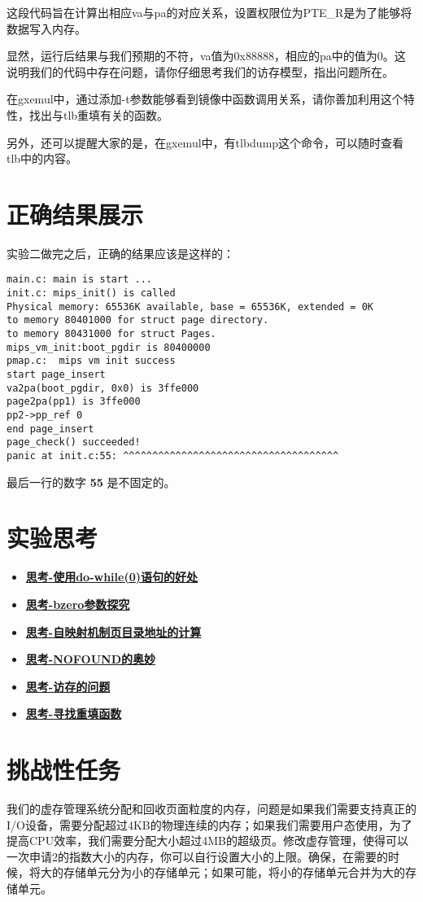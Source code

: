   这段代码旨在计算出相应va与pa的对应关系，设置权限位为PTE\_R是为了能够将数据写入内存。
  \begin{thinking}\label{think-memory-access}
  显然，运行后结果与我们预期的不符，va值为0x88888，相应的pa中的值为0。这说明我们的代码中存在问题，请你仔细思考我们的访存模型，指出问题所在。
  \end{thinking}
  \begin{thinking}\label{think-tlb-refill}
  在gxemul中，通过添加-t参数能够看到镜像中函数调用关系，请你善加利用这个特性，找出与tlb重填有关的函数。
  \end{thinking}
  另外，还可以提醒大家的是，在gxemul中，有tlbdump这个命令，可以随时查看tlb中的内容。
\section{正确结果展示}

实验二做完之后，正确的结果应该是这样的：

\begin{verbatim}
main.c: main is start ...
init.c: mips_init() is called
Physical memory: 65536K available, base = 65536K, extended = 0K
to memory 80401000 for struct page directory.
to memory 80431000 for struct Pages.
mips_vm_init:boot_pgdir is 80400000
pmap.c:  mips vm init success
start page_insert
va2pa(boot_pgdir, 0x0) is 3ffe000
page2pa(pp1) is 3ffe000
pp2->pp_ref 0
end page_insert
page_check() succeeded!
panic at init.c:55: ^^^^^^^^^^^^^^^^^^^^^^^^^^^^^^^^^^^^^
\end{verbatim}

最后一行的数字 \textbf{55} 是不固定的。

\section{实验思考}

\begin{itemize}
\item \hyperref[think-do_while]{\textbf{\textcolor{baseB}{思考-使用do-while(0)语句的好处}}}
\item \hyperref[think-bzero]{\textbf{\textcolor{baseB}{思考-bzero参数探究}}}
\item \hyperref[think-windows_pde_addr]{\textbf{\textcolor{baseB}{思考-自映射机制页目录地址的计算}}}
\item \hyperref[think-tlb]{\textbf{\textcolor{baseB}{思考-NOFOUND的奥妙}}}
\item \hyperref[think-memory-access]{\textbf{\textcolor{baseB}{思考-访存的问题}}}
\item \hyperref[think-tlb-refill]{\textbf{\textcolor{baseB}{思考-寻找重填函数}}}
\end{itemize}

\section{挑战性任务}

我们的虚存管理系统分配和回收页面粒度的内存，问题是如果我们需要支持真正的I/O设备，需要分配超过4KB的物理连续的内存；如果我们需要用户态使用，为了提高CPU效率，我们需要分配大小超过4MB的超级页。修改虚存管理，使得可以一次申请2的指数大小的内存，你可以自行设置大小的上限。确保，在需要的时候，将大的存储单元分为小的存储单元；如果可能，将小的存储单元合并为大的存储单元。
